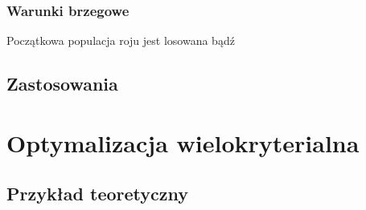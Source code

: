 \subsubsection{Warunki brzegowe}
Początkowa populacja roju jest losowana bądź 

\subsection{Zastosowania}


\section{Optymalizacja wielokryterialna}


\subsection{Przykład teoretyczny}


